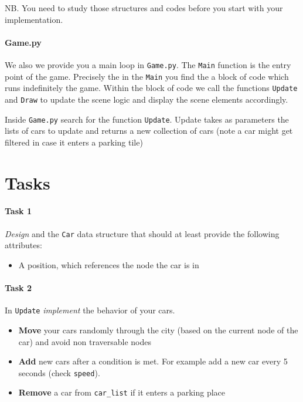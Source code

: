 \documentclass[10pt,a4paper]{article}
\begin{document}
\noindent
NB. You need to study those structures and codes before you start with your implementation. 
	
\paragraph{Game.py}

We also we provide you a main loop in \texttt{Game.py}. The \texttt{Main} function is the entry point of the game. Precisely the in the \texttt{Main} you find the a block of code which runs indefinitely the game. Within the block of code we call the functions \texttt{Update} and \texttt{Draw} to update the scene logic and display the scene elements accordingly.

\noindent
Inside \texttt{Game.py} search for the function \texttt{Update}. Update takes as parameters the lists of cars to update and returns a new collection of cars (note a car might get filtered in case it enters a parking tile)

\section{Tasks}	

\paragraph{Task 1} \textit{Design} and the \texttt{Car} data structure that should at least provide the following attributes:
\begin{itemize}[noitemsep,nolistsep]
	\item A position, which references the node the car is in
\end{itemize}

\paragraph{Task 2} In \texttt{Update} \textit{implement} the behavior of your cars.
\begin{itemize}[noitemsep,nolistsep]
	\item \textbf{Move} your cars randomly through the city (based on the current node of the car) and avoid non traversable nodes
	\item \textbf{Add} new cars after a condition is met. For example add a new car every 5 seconds (check \texttt{speed}).
	\item \textbf{Remove} a car from \texttt{car\_list} if it enters a parking place
\end{itemize}
\end{document}
